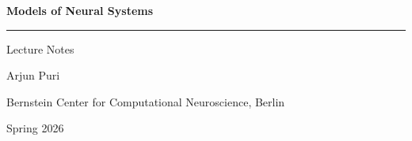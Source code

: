 \begin{titlepage}
  \centering
  \vspace*{3cm}

  {\sffamily\Huge\bfseries Models of Neural Systems}

  \vspace{0.6cm}
  {\rule{0.4\textwidth}{0.6pt}}

  \vspace{0.6cm}
  {\sffamily\Large Lecture Notes}

  \vspace{2.5cm}
  {\large Arjun Puri}

  \vspace{0.4cm}
  {\normalsize Bernstein Center for Computational Neuroscience, Berlin}

  \vfill

  {\small Spring 2026}

  \vspace{1cm}
\end{titlepage}

